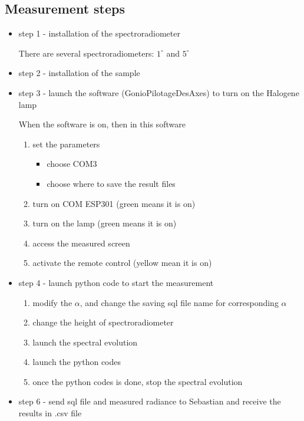 \subsection{Measurement steps}

\begin{itemize}
    \item step 1 - installation of the spectroradiometer

          There are several spectroradiometers: $1^{\circ}$ and $5^{\circ}$

    \item step 2 - installation of the sample

    \item step 3 - launch the software (GonioPilotageDesAxes) to turn on the Halogene lamp

          When the software is on, then in this software
          \begin{enumerate}
              \item set the parameters
                    \begin{itemize}
                        \item choose COM3
                        \item choose where to save the result files
                    \end{itemize}

              \item turn on COM ESP301 (green means it is on)
              \item turn on the lamp (green means it is on)
              \item access the measured screen
              \item activate the remote control (yellow mean it is on)
          \end{enumerate}

    \item step 4 - launch python code to start the measurement
          \begin{enumerate}
              \item modify the $\alpha$, and change the saving sql file name for corresponding $\alpha$
              \item change the height of spectroradiometer
              \item launch the spectral evolution
              \item launch the python codes
              \item once the python codes is done, stop the spectral evolution
          \end{enumerate}

    \item step 6 - send sql file and measured radiance to Sebastian and receive the results in .csv file
\end{itemize}


